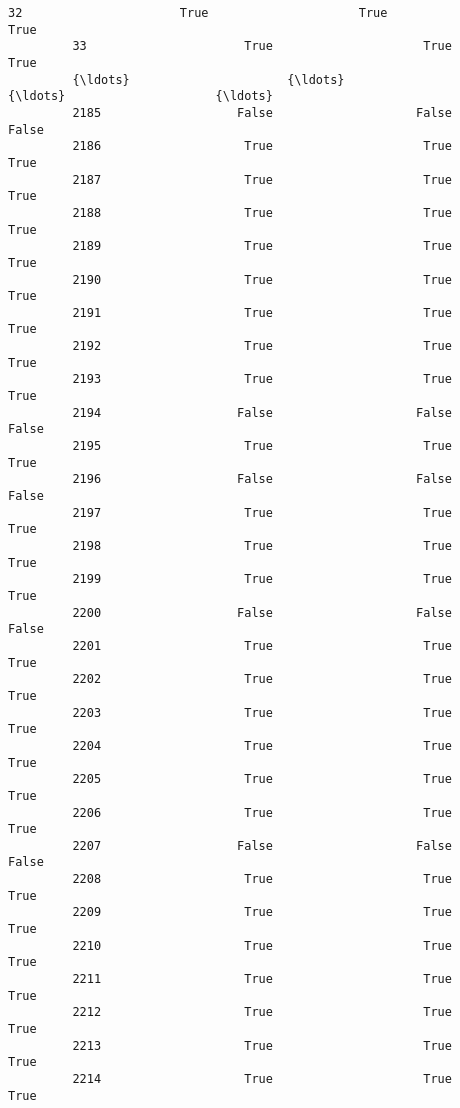 \documentclass[11pt]{llncs}
\begin{document}
\begin{Verbatim}[commandchars=\\\{\}]
         32                      True                     True                    True   
         33                      True                     True                    True   
         {\ldots}                      {\ldots}                      {\ldots}                     {\ldots}   
         2185                   False                    False                   False   
         2186                    True                     True                    True   
         2187                    True                     True                    True   
         2188                    True                     True                    True   
         2189                    True                     True                    True   
         2190                    True                     True                    True   
         2191                    True                     True                    True   
         2192                    True                     True                    True   
         2193                    True                     True                    True   
         2194                   False                    False                   False   
         2195                    True                     True                    True   
         2196                   False                    False                   False   
         2197                    True                     True                    True   
         2198                    True                     True                    True   
         2199                    True                     True                    True   
         2200                   False                    False                   False   
         2201                    True                     True                    True   
         2202                    True                     True                    True   
         2203                    True                     True                    True   
         2204                    True                     True                    True   
         2205                    True                     True                    True   
         2206                    True                     True                    True   
         2207                   False                    False                   False   
         2208                    True                     True                    True   
         2209                    True                     True                    True   
         2210                    True                     True                    True   
         2211                    True                     True                    True   
         2212                    True                     True                    True   
         2213                    True                     True                    True   
         2214                    True                     True                    True   
         

\end{Verbatim}
\end{document}

